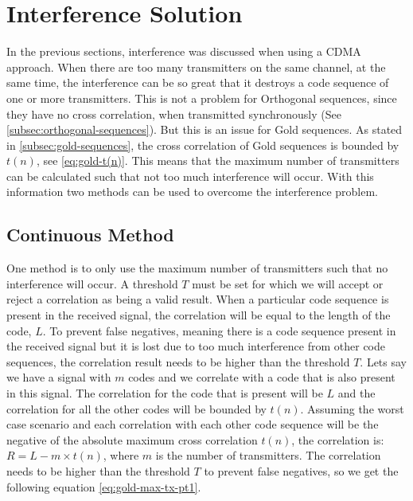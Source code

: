 
\section{Interference Solution}
\label{sec:interference-solution}

In the previous sections, interference was discussed when using a CDMA approach.
When there are too many transmitters on the same channel, at the same time, the interference can be so great that it destroys a code sequence of one or more transmitters.
This is not a problem for Orthogonal sequences, since they have no cross correlation, when transmitted synchronously (See \autoref{subsec:orthogonal-sequences}).
But this is an issue for Gold sequences. 
As stated in \autoref{subsec:gold-sequences}, the cross correlation of Gold sequences is bounded by $t(n)$, see \autoref{eq:gold-t(n)}.
This means that the maximum number of transmitters can be calculated such that not too much interference will occur. 
With this information two methods can be used to overcome the interference problem.



\subsection{Continuous Method}
\label{subsec:continuous-method-modulation}


One method is to only use the maximum number of transmitters such that no interference will occur.
A threshold $T$ must be set for which we will accept or reject a correlation as being a valid result.
When a particular code sequence is present in the received signal, the correlation will be equal to the length of the code, $L$.
To prevent false negatives, meaning there is a code sequence present in the received signal but it is lost due to too much interference from other code sequences, the correlation result needs to be higher than the threshold $T$.
Lets say we have a signal with $m$ codes and we correlate with a code that is also present in this signal.
The correlation for the code that is present will be $L$ and the correlation for all the other codes will be bounded by $t(n)$.
Assuming the worst case scenario and each correlation with each other code sequence will be the negative of the absolute maximum cross correlation $t(n)$, the correlation is: $R = L - m \times t(n)$, where $m$ is the number of transmitters.
The correlation needs to be higher than the threshold $T$ to prevent false negatives, so we get the following equation \autoref{eq:gold-max-tx-pt1}.

